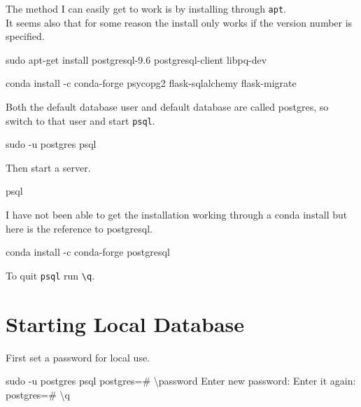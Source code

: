 \documentclass[]{book}
\newenvironment{Shaded}{\begin{snugshade}}{\end{snugshade}}
\newcommand{\ExtensionTok}[1]{#1}
\newcommand{\FunctionTok}[1]{\textcolor[rgb]{0.00,0.00,0.00}{#1}}
\newcommand{\NormalTok}[1]{#1}
\newcommand{\VariableTok}[1]{\textcolor[rgb]{0.00,0.00,0.00}{#1}}
\begin{document}
The method I can easily get to work is by installing through \texttt{apt}.\\
It seems also that for some reason the install only works if the version number is specified.

\begin{Shaded}
\begin{Highlighting}[]
\FunctionTok{sudo}\NormalTok{ apt-get install postgresql-9.6 postgresql-client libpq-dev}
\end{Highlighting}
\end{Shaded}

conda install -c conda-forge psycopg2 flask-sqlalchemy flask-migrate

Both the default database user and default database are called postgres, so switch to that user and start \texttt{psql}.

\begin{Shaded}
\begin{Highlighting}[]
\FunctionTok{sudo}\NormalTok{ -u postgres psql}
\end{Highlighting}
\end{Shaded}

Then start a server.

\begin{Shaded}
\begin{Highlighting}[]
\ExtensionTok{psql}
\end{Highlighting}
\end{Shaded}

I have not been able to get the installation working through a conda install but here is the reference to postgresql.

\begin{Shaded}
\begin{Highlighting}[]
\ExtensionTok{conda}\NormalTok{ install -c conda-forge postgresql}
\end{Highlighting}
\end{Shaded}

To quit \texttt{psql} run \texttt{\textbackslash{}q}.

\hypertarget{starting-local-database}{%
\section{Starting Local Database}\label{starting-local-database}}

First set a password for local use.

\begin{Shaded}
\begin{Highlighting}[]
\FunctionTok{sudo}\NormalTok{ -u postgres psql}
\VariableTok{postgres=}\NormalTok{# \textbackslash{}}\ExtensionTok{password}
\ExtensionTok{Enter}\NormalTok{ new password:}
\ExtensionTok{Enter}\NormalTok{ it again:}
\VariableTok{postgres=}\NormalTok{# \textbackslash{}}\ExtensionTok{q}
\end{Highlighting}
\end{Shaded}
\end{document}
